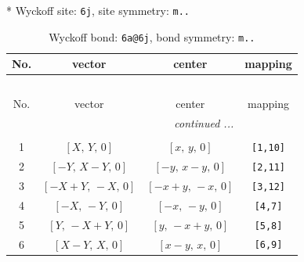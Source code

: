 \documentclass[fleqn,8pt]{jsarticle}
\begin{document}
* Wyckoff site: {\tt 6j}, site symmetry: {\tt m..}
\renewcommand{\arraystretch}{1.2}
\begin{longtable}{cccc}
\caption{Wyckoff bond: {\tt 6a@6j}, bond symmetry: {\tt m..}}
 \\
 \hline \hline
No. & vector & center & mapping \\ \hline \endfirsthead

\multicolumn{3}{l}{\tablename\ \thetable{}} \\
 \hline \hline
No. & vector & center & mapping \\ \hline \endhead

 \hline \hline
\multicolumn{3}{r}{\footnotesize\it continued ...} \\ \endfoot

 \hline \hline
\multicolumn{3}{r}{} \\ \endlastfoot

1 & $\left[ X,\, Y,\, 0 \right]$ & $\left[ x,\, y,\, 0 \right]$ & {\tt [1,10]} \\ \hline
2 & $\left[ - Y,\, X - Y,\, 0 \right]$ & $\left[ - y,\, x - y,\, 0 \right]$ & {\tt [2,11]} \\ \hline
3 & $\left[ - X + Y,\, - X,\, 0 \right]$ & $\left[ - x + y,\, - x,\, 0 \right]$ & {\tt [3,12]} \\ \hline
4 & $\left[ - X,\, - Y,\, 0 \right]$ & $\left[ - x,\, - y,\, 0 \right]$ & {\tt [4,7]} \\ \hline
5 & $\left[ Y,\, - X + Y,\, 0 \right]$ & $\left[ y,\, - x + y,\, 0 \right]$ & {\tt [5,8]} \\ \hline
6 & $\left[ X - Y,\, X,\, 0 \right]$ & $\left[ x - y,\, x,\, 0 \right]$ & {\tt [6,9]} \\
\end{longtable}
\renewcommand{\arraystretch}{1.2}
\end{document}
